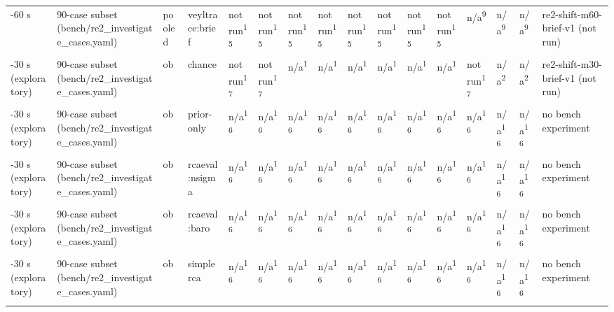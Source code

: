\begin{table}[t]
\begin{tabular}{llllllllllllllll}
-60 s & 90-case subset (bench/re2\_investigate\_cases.yaml) & pooled & veyltrace:brief & not run\textsuperscript{15} & not run\textsuperscript{15} & not run\textsuperscript{15} & not run\textsuperscript{15} & not run\textsuperscript{15} & not run\textsuperscript{15} & not run\textsuperscript{15} & not run\textsuperscript{15} & n/a\textsuperscript{9} & n/a\textsuperscript{9} & n/a\textsuperscript{9} & re2-shift-m60-brief-v1 (not run) \\
-30 s (exploratory) & 90-case subset (bench/re2\_investigate\_cases.yaml) & ob & chance & not run\textsuperscript{17} & not run\textsuperscript{17} & n/a\textsuperscript{1} & n/a\textsuperscript{1} & n/a\textsuperscript{1} & n/a\textsuperscript{1} & n/a\textsuperscript{1} & n/a\textsuperscript{1} & not run\textsuperscript{17} & n/a\textsuperscript{2} & n/a\textsuperscript{2} & re2-shift-m30-brief-v1 (not run) \\
-30 s (exploratory) & 90-case subset (bench/re2\_investigate\_cases.yaml) & ob & prior-only & n/a\textsuperscript{16} & n/a\textsuperscript{16} & n/a\textsuperscript{16} & n/a\textsuperscript{16} & n/a\textsuperscript{16} & n/a\textsuperscript{16} & n/a\textsuperscript{16} & n/a\textsuperscript{16} & n/a\textsuperscript{16} & n/a\textsuperscript{16} & n/a\textsuperscript{16} & no bench experiment \\
-30 s (exploratory) & 90-case subset (bench/re2\_investigate\_cases.yaml) & ob & rcaeval:nsigma & n/a\textsuperscript{16} & n/a\textsuperscript{16} & n/a\textsuperscript{16} & n/a\textsuperscript{16} & n/a\textsuperscript{16} & n/a\textsuperscript{16} & n/a\textsuperscript{16} & n/a\textsuperscript{16} & n/a\textsuperscript{16} & n/a\textsuperscript{16} & n/a\textsuperscript{16} & no bench experiment \\
-30 s (exploratory) & 90-case subset (bench/re2\_investigate\_cases.yaml) & ob & rcaeval:baro & n/a\textsuperscript{16} & n/a\textsuperscript{16} & n/a\textsuperscript{16} & n/a\textsuperscript{16} & n/a\textsuperscript{16} & n/a\textsuperscript{16} & n/a\textsuperscript{16} & n/a\textsuperscript{16} & n/a\textsuperscript{16} & n/a\textsuperscript{16} & n/a\textsuperscript{16} & no bench experiment \\
-30 s (exploratory) & 90-case subset (bench/re2\_investigate\_cases.yaml) & ob & simplerca & n/a\textsuperscript{16} & n/a\textsuperscript{16} & n/a\textsuperscript{16} & n/a\textsuperscript{16} & n/a\textsuperscript{16} & n/a\textsuperscript{16} & n/a\textsuperscript{16} & n/a\textsuperscript{16} & n/a\textsuperscript{16} & n/a\textsuperscript{16} & n/a\textsuperscript{16} & no bench experiment \\

\end{tabular}
\end{table}
